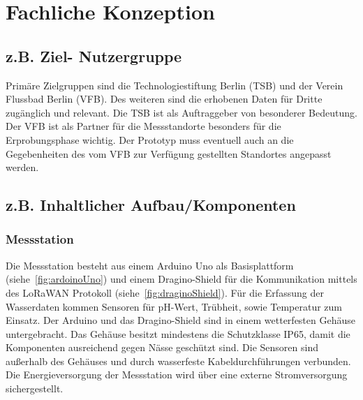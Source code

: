 \section{Fachliche Konzeption}

\subsection{z.B. Ziel- Nutzergruppe}

Primäre Zielgruppen sind die Technologiestiftung Berlin (TSB) und der Verein Flussbad Berlin (VFB). Des weiteren sind die erhobenen Daten für Dritte zugänglich und relevant. Die TSB ist als Auftraggeber von besonderer Bedeutung. Der VFB ist als Partner für die Messstandorte besonders für die Erprobungsphase wichtig. Der Prototyp muss eventuell auch an die Gegebenheiten des vom VFB zur Verfügung gestellten Standortes angepasst werden.

\subsection{z.B. Inhaltlicher Aufbau/Komponenten}\label{subsec:con_strct_comp}

\subsubsection{Messstation}
Die Messstation besteht aus einem Arduino Uno als Basisplattform (siehe~\autoref{fig:ardoinoUno}) und einem Dragino-Shield für die Kommunikation mittels des LoRaWAN Protokoll
(siehe~\autoref{fig:draginoShield}). Für die Erfassung der Wasserdaten kommen Sensoren für pH-Wert, Trübheit, sowie Temperatur zum Einsatz.
Der Arduino und das Dragino-Shield sind in einem wetterfesten Gehäuse untergebracht. Das Gehäuse besitzt mindestens die Schutzklasse IP65, damit die Komponenten ausreichend gegen
Nässe geschützt sind. Die Sensoren sind außerhalb des Gehäuses und durch wasserfeste Kabeldurchführungen verbunden. Die Energieversorgung der Messstation wird über eine externe
Stromversorgung sichergestellt.

